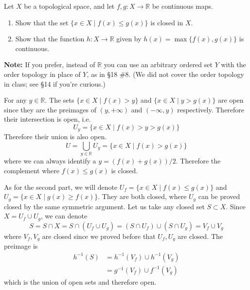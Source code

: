   \begin{exercise}
    Let $X$ be a topological space, and let $f,g: X \to \mathbb{R}$ be continuous maps.
    \begin{enumerate}
      \item Show that the set $\{x \in X \mid f(x) \leq g(x)\}$ is closed in $X$.
      
      \item Show that the function $h: X \to \mathbb{R}$ given by $h(x) = \max\{f(x),g(x)\}$ is continuous.
    \end{enumerate}
    
    \noindent\textbf{Note:} If you prefer, instead of $\mathbb{R}$ you can use an arbitrary ordered set $Y$ with the order topology in place of $Y$, as in \S18 \#8. (We did not cover the order topology in class; see \S14 if you're curious.)
  \end{exercise}
  \begin{solution}
    For any $y \in \mathbb{R}$. The sets $\{x \in X \mid f(x) > y\}$ and $\{x \in X \mid y > g(x)\}$ are open since they are the preimages of $(y, +\infty)$ and $(-\infty, y)$ respectively. Therefore their intersection is open, i.e. 
    \begin{equation}
      U_y = \{x \in X \mid f(x) > y > g(x)\}
    \end{equation} 
    Therefore their union is also open. 
    \begin{equation}
      U = \bigcup_{y \in \mathbb{R}} U_y = \{x \in X \mid f(x) > g(x)\}
    \end{equation}
    where we can always identify a $y = (f(x) + g(x))/2$. Therefore the complement where $f(x) \leq g(x)$ is closed. 
    
    As for the second part, we will denote $U_f = \{x \in X \mid f(x) \leq g(x)\}$ and $U_g = \{x \in X \mid g(x) \geq f(x) \}$. They are both closed, where $U_g$ can be proved closed by the same symmetric argument. Let us take any closed set $S \subset X$. Since $X = U_f \cup U_g$, we can denote 
    \begin{equation}
      S = S \cap X = S \cap (U_f \cup U_g) = (S \cap U_f) \cup (S \cap U_g) = V_f \cup V_g
    \end{equation}
    where $V_f, V_g$ are closed since we proved before that $U_f, U_g$ are closed. The preimage is 
    \begin{align}
      h^{-1} (S) & = h^{-1} (V_f) \cup h^{-1} (V_g) \\
                 & = g^{-1} (V_f) \cup f^{-1} (V_g)
    \end{align}
    which is the union of open sets and therefore open. 
  \end{solution}


